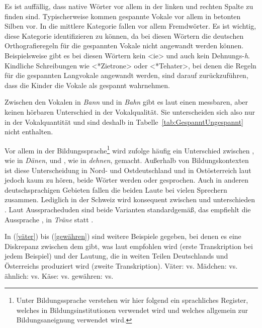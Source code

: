 Es ist auffällig, dass native Wörter vor allem in der linken und rechten Spalte zu finden sind. Typischerweise kommen gespannte Vokale vor allem in betonten Silben vor. In die mittlere Kategorie fallen vor allem Fremdwörter. Es ist wichtig, diese Kategorie identifizieren zu können, da bei diesen Wörtern die deutschen Orthografieregeln für die gespannten Vokale nicht angewandt werden können. Beispielsweise gibt es bei diesen Wörtern kein <ie> und auch kein Dehnungs-\textit{h}. Kindliche Schreibungen wie <*Zietrone> oder <*Tehater>, bei denen die Regeln für die gespannten Langvokale angewandt werden, sind darauf zurückzuführen, dass die Kinder die Vokale als gespannt wahrnehmen.

Zwischen den Vokalen \textipa{[a]} in \textit{Bann} und \textipa{[a:]} in \textit{Bahn} gibt es laut \citet[14--15]{Becker1998} einen messbaren, aber keinen hörbaren Unterschied in der Vokalqualität. Sie unterscheiden sich also nur in der Vokalquantität und sind deshalb in Tabelle~\ref{tab:GespanntUngespannt} nicht enthalten.


Vor allem in der Bildungssprache\footnote{Unter Bildungssprache verstehen wir hier \citet[]{Habermas1977} folgend ein sprachliches Register, welches in Bildungsinstitutionen verwendet wird und welches allgemein zur Bildungsaneignung verwendet wird.} wird \citet[15--16]{Becker1998} zufolge häufig ein Unterschied zwischen \textipa{[E:]}, wie in \textit{Dänen}, und \textipa{[e:]}, wie in \textit{dehnen}, gemacht. Außerhalb von Bildungskontexten ist diese Unterscheidung in Nord- und Ostdeutschland und in Ostösterreich laut \citet[67]{DudenAussprache2023} jedoch kaum zu hören, beide Wörter werden \textipa{[\textprimstress de:n@n]} oder \textipa{[\textprimstress de:n\s{n}]} gesprochen. Auch in anderen deutschsprachigen Gebieten fallen die beiden Laute bei vielen Sprechern zusammen. Lediglich in der Schweiz wird konsequent zwischen \textipa{[E:]} und \textipa{[e:]} unterschieden \citep[67]{DudenAussprache2023}. Laut Ausspracheduden sind beide Varianten standardgemäß, das \citet[138]{DudenZweifelsfaelle2021} empfiehlt die Aussprache \textipa{[E:]}, \zB in \textit{Träne}  statt .

\largerpage
  In (\ref{väter}) bis (\ref{gewähren}) sind weitere Beispiele gegeben, bei denen es eine Diskrepanz zwischen dem gibt, was laut \citet{DudenZweifelsfaelle2021} empfohlen wird (erste Transkription bei jedem Beispiel) und der Lautung, die in weiten Teilen Deutschlands und Österreichs produziert wird (zweite Transkription). 
\ea
\ea \label{väter}Väter: \textipa{[\textprimstress fE:.t5]} vs. \textipa{[\textprimstress fe:.t5]}
\ex \label{mädchen}Mädchen: \textipa{[\textprimstress mE:t.\c{c}@n]} vs. \textipa{[\textprimstress me:t.\c{c}@n]}
\ex \label{ähnlich}ähnlich: \textipa{[\textprimstress PE:n.lI\c{c}]} vs. \textipa{[\textprimstress Pe:n.lI\c{c}]}
\ex \label{käse}Käse: \textipa{[\textprimstress kE:.z@]} vs. \textipa{[\textprimstress ke:.z@]}
\ex \label{gewähren}gewähren: \textipa{[g@\textprimstress vE:.K@n]} vs. \textipa{[g@\textprimstress ve:.K@n]}
\z
\z

